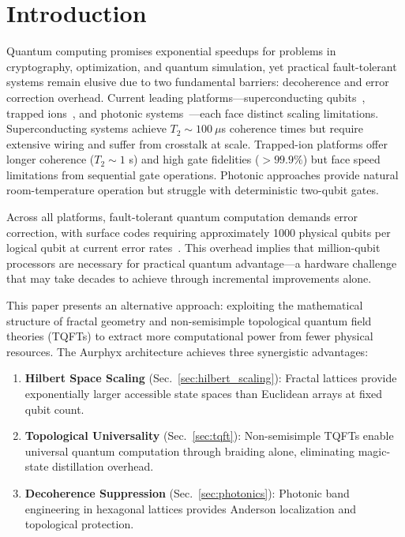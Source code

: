 \documentclass[aps,prx,twocolumn,superscriptaddress,showpacs,showkeys,floatfix]{revtex4-2}
\theoremstyle{plain}
\theoremstyle{definition}
\begin{document}

\section{Introduction}
\label{sec:intro}

Quantum computing promises exponential speedups for problems in cryptography, optimization, and quantum simulation, yet practical fault-tolerant systems remain elusive due to two fundamental barriers: decoherence and error correction overhead. Current leading platforms---superconducting qubits~\cite{IBM2023,Google2024}, trapped ions~\cite{IonQ2023,Quantinuum2024}, and photonic systems~\cite{PsiQuantum2024,Xanadu2024}---each face distinct scaling limitations. Superconducting systems achieve $T_2 \sim 100~\mu$s coherence times but require extensive wiring and suffer from crosstalk at scale. Trapped-ion platforms offer longer coherence ($T_2 \sim 1$ s) and high gate fidelities ($> 99.9\%$) but face speed limitations from sequential gate operations. Photonic approaches provide natural room-temperature operation but struggle with deterministic two-qubit gates.

Across all platforms, fault-tolerant quantum computation demands error correction, with surface codes requiring approximately 1000 physical qubits per logical qubit at current error rates~\cite{Fowler2012}. This overhead implies that million-qubit processors are necessary for practical quantum advantage---a hardware challenge that may take decades to achieve through incremental improvements alone.

This paper presents an alternative approach: exploiting the mathematical structure of fractal geometry and non-semisimple topological quantum field theories (TQFTs) to extract more computational power from fewer physical resources. The Aurphyx architecture achieves three synergistic advantages:

\begin{enumerate}
\item \textbf{Hilbert Space Scaling} (Sec.~\ref{sec:hilbert_scaling}): Fractal lattices provide exponentially larger accessible state spaces than Euclidean arrays at fixed qubit count.
\item \textbf{Topological Universality} (Sec.~\ref{sec:tqft}): Non-semisimple TQFTs enable universal quantum computation through braiding alone, eliminating magic-state distillation overhead.
\item \textbf{Decoherence Suppression} (Sec.~\ref{sec:photonics}): Photonic band engineering in hexagonal lattices provides Anderson localization and topological protection.
\end{enumerate}
\end{document}
